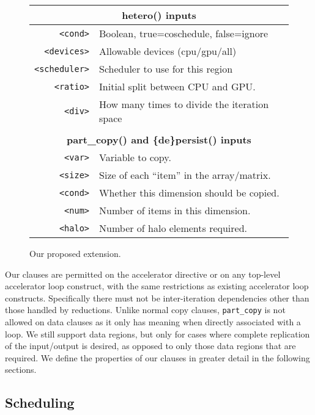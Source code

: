 \begin{figure}[h]
  \centering
  \inputminted[fontsize=\scriptsize,frame=single]{c}{snippets/extension.c}
  {\footnotesize
    \begin{tabular}{rl}
      \\
      \multicolumn{2}{c}{\textbf{hetero() inputs}}\\
      \hline
      \verb#<cond>#& Boolean, true=coschedule, false=ignore\\
      \verb#<devices>#& Allowable devices (cpu/gpu/all)\\
      \verb#<scheduler>#& Scheduler to use for this region\\
      \verb#<ratio>#& Initial split between CPU and GPU.\\
      \verb#<div>#& How many times to divide the iteration space\\
      &\\
      \multicolumn{2}{c}{\textbf{part\_copy() and \{de\}persist() inputs}}\\
      \hline
      \verb#<var>#& Variable to copy.\\
      \verb#<size>#& Size of each ``item'' in the array/matrix.\\
      \verb#<cond>#& Whether this dimension should be copied.\\
      \verb#<num>#& Number of items in this dimension.\\
      \verb#<halo>#& Number of halo elements required.\\
    \end{tabular}
  }
  \caption{Our proposed extension.\label{fig:extension}}
\end{figure}

Our clauses are permitted on the accelerator directive or on any top-level
accelerator loop construct, with the same restrictions as existing accelerator
loop constructs.  Specifically there must not be inter-iteration dependencies
other than those handled by reductions. Unlike normal copy clauses,
\verb#part_copy# is not allowed on data clauses as it only has meaning when
directly associated with a loop. We still support data regions, but only for
cases where complete replication of the input/output is desired, as opposed to
only those data regions that are required. We define the properties of our
clauses in greater detail in the following sections.


\subsection{Scheduling}
\label{sec:assign}

